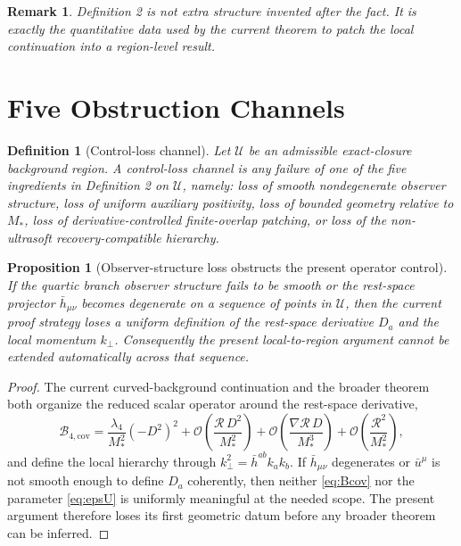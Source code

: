 \documentclass[11pt]{article}
\newtheorem{definition}{Definition}
\newtheorem{proposition}{Proposition}
\newtheorem{remark}{Remark}
\begin{document}
\begin{remark}
Definition 2 is not extra structure invented after the fact. It is exactly the quantitative data used by the current theorem to patch the local continuation into a region-level result.
\end{remark}

\section{Five Obstruction Channels}

\begin{definition}[Control-loss channel]
Let \(\mathcal U\) be an admissible exact-closure background region. A \emph{control-loss channel} is any failure of one of the five ingredients in Definition 2 on \(\mathcal U\), namely: loss of smooth nondegenerate observer structure, loss of uniform auxiliary positivity, loss of bounded geometry relative to \(M_*\), loss of derivative-controlled finite-overlap patching, or loss of the non-ultrasoft recovery-compatible hierarchy.
\end{definition}

\begin{proposition}[Observer-structure loss obstructs the present operator control]
If the quartic branch observer structure fails to be smooth or the rest-space projector \(\bar h_{\mu\nu}\) becomes degenerate on a sequence of points in \(\mathcal U\), then the current proof strategy loses a uniform definition of the rest-space derivative \(D_a\) and the local momentum \(k_\perp\). Consequently the present local-to-region argument cannot be extended automatically across that sequence.
\end{proposition}

\begin{proof}
The current curved-background continuation and the broader theorem both organize the reduced scalar operator around the rest-space derivative,
\begin{equation}
\mathcal B_{4,\mathrm{cov}}
=
\frac{\lambda_4}{M_*^2}(-D^2)^2
+ \mathcal O\!\left(\frac{\mathcal R\,D^2}{M_*^2}\right)
+ \mathcal O\!\left(\frac{\nabla\mathcal R\,D}{M_*^3}\right)
+ \mathcal O\!\left(\frac{\mathcal R^2}{M_*^2}\right),
\label{eq:Bcov}
\end{equation}
and define the local hierarchy through \(k_\perp^2=\bar h^{ab}k_a k_b\). If \(\bar h_{\mu\nu}\) degenerates or \(\bar u^\mu\) is not smooth enough to define \(D_a\) coherently, then neither \eqref{eq:Bcov} nor the parameter \eqref{eq:epsU} is uniformly meaningful at the needed scope. The present argument therefore loses its first geometric datum before any broader theorem can be inferred.
\end{proof}
\end{document}

